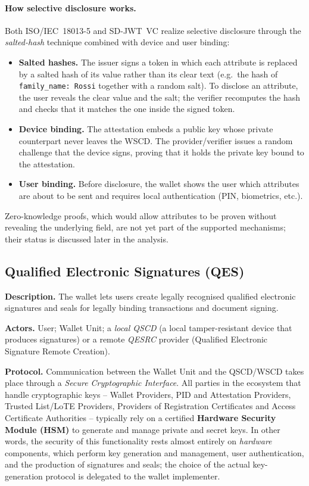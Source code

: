 \documentclass[binding=0.6cm,oneside,noexaminfo]{sapthesis}
\begin{document}
\paragraph{How selective disclosure works.} Both ISO/IEC~18013-5 and SD-JWT~VC realize selective disclosure through the
\emph{salted-hash} technique combined with device and user binding:
\begin{itemize}[noitemsep]
  \item \textbf{Salted hashes.} The issuer signs a token in which each attribute is replaced by a salted hash of its
        value rather than its clear text (e.g.\ the hash of \texttt{family\_name:\,Rossi} together with a random salt).
        To disclose an attribute, the user reveals the clear value and the salt; the verifier recomputes the hash and
        checks that it matches the one inside the signed token.
  \item \textbf{Device binding.} The attestation embeds a public key whose private counterpart never leaves the WSCD.
        The provider/verifier issues a random challenge that the device signs, proving that it holds the private key
        bound to the attestation.
  \item \textbf{User binding.} Before disclosure, the wallet shows the user which attributes are about to be sent and
        requires local authentication (PIN, biometrics, etc.).
\end{itemize}
Zero-knowledge proofs, which would allow attributes to be proven without revealing the underlying field, are not yet
part of the supported mechanisms; their status is discussed later in the analysis.

\subsection{Qualified Electronic Signatures (QES)}
\label{eudi:qes}
\textbf{Description.} The wallet lets users create legally recognised qualified electronic signatures and seals for
legally binding transactions and document signing.

\textbf{Actors.} User; Wallet Unit; a \emph{local QSCD} (a local tamper-resistant device that produces signatures) or a
remote \emph{QESRC} provider (Qualified Electronic Signature Remote Creation).

\textbf{Protocol.} Communication between the Wallet Unit and the QSCD/WSCD takes place through a \emph{Secure
Cryptographic Interface}. All parties in the ecosystem that handle cryptographic keys -- Wallet Providers, PID and
Attestation Providers, Trusted List/LoTE Providers, Providers of Registration Certificates and Access Certificate
Authorities -- typically rely on a certified \textbf{Hardware Security Module (HSM)} to generate and manage private and
secret keys. In other words, the security of this functionality rests almost entirely on \emph{hardware} components,
which perform key generation and management, user authentication, and the production of signatures and seals; the choice
of the actual key-generation protocol is delegated to the wallet implementer.
\end{document}
